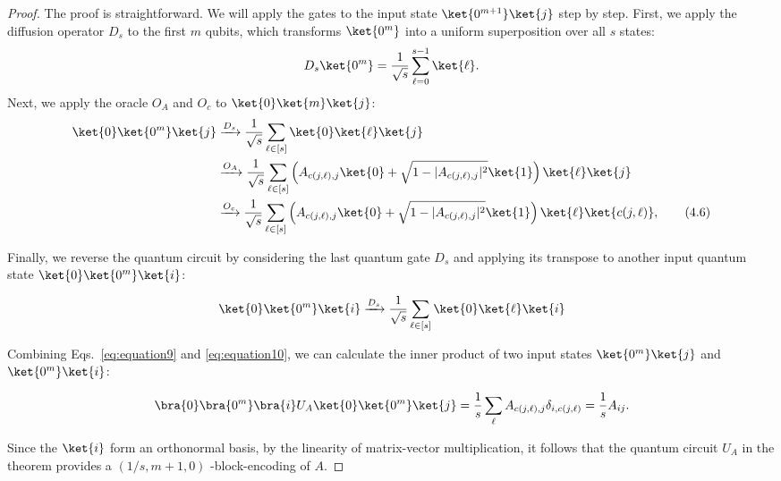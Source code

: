 \documentclass{article}
\begin{document}
    \begin{proof}
        The proof is straightforward. We will apply the gates to the input state $\ket{0^{m+1}}\ket{j}$ step by step.
        First, we apply the diffusion operator $D_s$ to the first $m$ qubits, which transforms $\ket{0^m}$ into a uniform superposition over all $s$ states:
        \begin{equation}
            D_s \ket{0^m} = \frac{1}{\sqrt{s}} \sum_{\ell=0}^{s-1} \ket{\ell}.\label{eq:equation8}
        \end{equation}
        Next, we apply the oracle $O_A$ and $O_c$ to $\ket{0}\ket{m}\ket{j}$:
        \begin{equation}
            \begin{align*}
                \ket{0} \ket{0^m} \ket{j}
                &\xrightarrow{D_s} \frac{1}{\sqrt{s}} \sum_{\ell \in [s]} \ket{0} \ket{\ell} \ket{j} \\
                &\xrightarrow{O_A} \frac{1}{\sqrt{s}} \sum_{\ell \in [s]} \left( A_{c(j, \ell), j} \ket{0} + \sqrt{1 - |A_{c(j, \ell), j}|^2} \ket{1} \right) \ket{\ell} \ket{j} \\
                &\xrightarrow{O_c} \frac{1}{\sqrt{s}} \sum_{\ell \in [s]} \left( A_{c(j, \ell), j} \ket{0} + \sqrt{1 - |A_{c(j, \ell), j}|^2} \ket{1} \right) \ket{\ell} \ket{c(j, \ell)},
                \tag{4.6}
            \end{align*}\label{eq:equation9}
        \end{equation}

        Finally, we reverse the quantum circuit by considering the last quantum gate $D_s$ and applying its transpose to another input quantum state $\ket{0}\ket{0^m}\ket{i}$:

        \begin{equation}
            \ket{0} \ket{0^m} \ket{i}
            \xrightarrow{D_s} \frac{1}{\sqrt{s}} \sum_{\ell \in [s]} \ket{0} \ket{\ell} \ket{i}\label{eq:equation10}
        \end{equation}

        Combining Eqs.~\eqref{eq:equation9} and \eqref{eq:equation10}, we can calculate the inner product of two input states $\ket{0^m}\ket{j}$ and $\ket{0^m}\ket{i}$:

        \begin{equation}
            \bra{0} \bra{0^m} \bra{i} U_A \ket{0} \ket{0^m} \ket{j}
            = \frac{1}{s} \sum_{\ell} A_{c(j, \ell), j} \delta_{i, c(j, \ell)}
            = \frac{1}{s} A_{ij}.\label{eq:equation11}
        \end{equation}

        Since the $\ket{i}$ form an orthonormal basis, by the linearity of matrix-vector multiplication, it follows that the quantum circuit $U_A$ in the theorem provides a $(1/s,m+1,0)$ -block-encoding of $A$.


    \end{proof}
\end{document}
